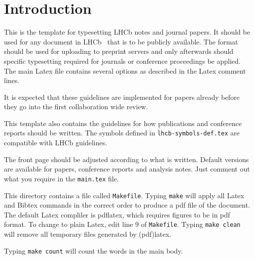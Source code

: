 
\chapter{Introduction}
\label{sec:Introduction}

This is the template for typesetting LHCb notes and journal papers.
It should be used for any document in LHCb~\cite{Alves:2008zz} that is to be
publicly available. The format should be used for uploading to
preprint servers and only afterwards should specific typesetting
required for journals or conference proceedings be applied. The main
Latex file contains several options as described in the Latex comment
lines.

It is expected that these guidelines are implemented for papers already
before they go into the first collaboration wide review. 

This template also contains the guidelines for how publications and
conference reports should be written. 
The symbols defined in \texttt{lhcb-symbols-def.tex} are compatible with
LHCb guidelines.

The front page should be adjusted according to what is
written. Default versions are available for papers, conference reports
and analysis notes. Just comment out what you require in the
\texttt{main.tex} file.

This directory contains a file called \texttt{Makefile}.
Typing \texttt{make} will apply all Latex and Bibtex commands 
in the correct order to produce a pdf file of the document.
The default Latex compliler is pdflatex, which requires figures 
to be in pdf format. 
To change to plain Latex, edit line 9 of \texttt{Makefile}.
Typing \texttt{make clean} will remove all temporary files generated by (pdf)latex.

Typing \texttt{make count} will count the words in the main body.